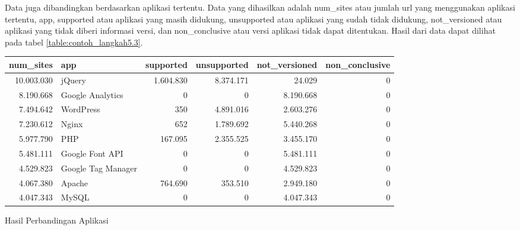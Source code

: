 Data juga dibandingkan berdasarkan aplikasi tertentu. Data yang dihasilkan adalah num\_sites atau jumlah url yang menggunakan aplikasi tertentu, app, supported atau aplikasi yang masih didukung, unsupported atau aplikasi yang sudah tidak didukung, not\_versioned atau aplikasi yang tidak diberi informasi versi, dan non\_conclusive atau versi aplikasi tidak dapat ditentukan. Hasil dari data dapat dilihat pada tabel \ref{table:contoh_langkah5.3}.
\begin{adjustwidth}{-2.5 cm}{-2.5 cm}\centering\begin{threeparttable}[!htb]
	\begin{tabular}{|r|l|r|r|r|r|}
		\hline
		\textbf{num\_sites} & \textbf{app} & \textbf{supported} & \textbf{unsupported} & \textbf{not\_versioned} & \textbf{non\_conclusive}\\
		\hline
		10.003.030 &jQuery &1.604.830 &8.374.171 &24.029 &0 \\
		\hline
		8.190.668 &Google Analytics &0 &0 &8.190.668 &0 \\
		\hline
		7.494.642 &WordPress &350 &4.891.016 &2.603.276 &0 \\
		\hline
		7.230.612 &Nginx &652 &1.789.692 &5.440.268 &0 \\
		\hline
		5.977.790 &PHP &167.095 &2.355.525 &3.455.170 &0 \\
		\hline
		5.481.111 &Google Font API &0 &0 &5.481.111 &0 \\
		\hline
		4.529.823 &Google Tag Manager &0 &0 &4.529.823 &0 \\
		\hline
		4.067.380 &Apache &764.690 &353.510 &2.949.180 &0 \\
		\hline
		4.047.343 &MySQL &0 &0 &4.047.343 &0 \\
		\hline
	\end{tabular}
	\caption{Hasil Perbandingan Aplikasi}
	\label{table:contoh_langkah5.3}
\end{threeparttable}\end{adjustwidth}


